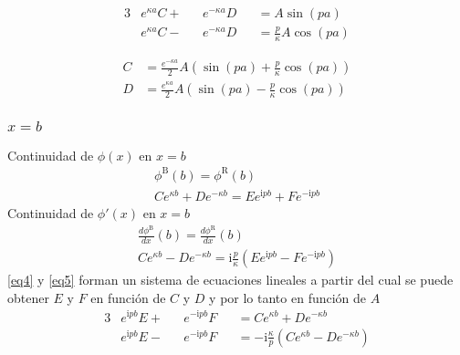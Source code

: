 \documentclass[11pt,a4paper]{article}
\newcommand{\I}{\text{i}}
\begin{document}
\begin{alignat}{3}
&e^{\kappa a}C + &&e^{-\kappa a}D &&= A\sin\left(pa\right) \\
&e^{\kappa a}C - &&e^{-\kappa a}D &&= \frac{p}{\kappa} A\cos\left(pa\right)
\end{alignat}

\begin{align}
C &= \frac{e^{-\kappa a}}{2}A\left(\sin\left(pa\right) + \frac{p}{\kappa} \cos\left(pa\right)\right)\\
D &= \frac{e^{\kappa a}}{2}A\left(\sin\left(pa\right) - \frac{p}{\kappa} \cos\left(pa\right) \right)
\end{align}

\subsubsection{$x = b$}

Continuidad de $\phi(x)$ en $x = b$
\begin{gather}
	\phi^{\text{B}}(b) = \phi^{\text{R}}(b) \\ \label{eq4}
	Ce^{\kappa b} + De^{-\kappa b} = Ee^{\I pb} + Fe^{-\I pb}
\end{gather}
Continuidad de $\phi'(x)$ en $x = b$
\begin{gather}
	\frac{d\phi^{\text{B}}}{dx}(b) = \frac{d\phi^{\text{R}}}{dx}(b) \\ \label{eq5}
	Ce^{\kappa b} - De^{-\kappa b} = \I\frac{p}{\kappa} \left(Ee^{\I pb} - Fe^{-\I pb}\right)
\end{gather}
\eqref{eq4} y \eqref{eq5} forman un sistema de ecuaciones lineales a partir del cual se puede obtener $E$ y $F$ en función de $C$ y $D$ y por lo tanto en función de $A$
\begin{alignat}{3}
    &e^{\I pb}E + &&e^{-\I pb}F &&= Ce^{\kappa b} + De^{-\kappa b} \\
	&e^{\I pb}E - &&e^{-\I pb}F  &&= -\I\frac{\kappa}{p} \left(Ce^{\kappa b} - De^{-\kappa b}\right)
\end{alignat}
\end{document}
